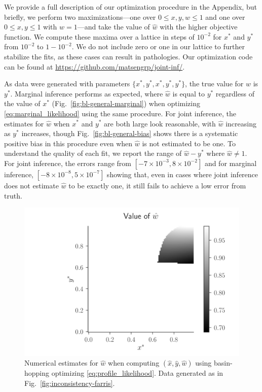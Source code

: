 \documentclass[11pt]{article}
\begin{document}
We provide a full description of our optimization procedure in the Appendix, but briefly, we perform two maximizations---one over $0 \le x,y,w \le 1$ and one over $0 \le x,y \le 1$ with $w=1$---and take the value of $\hat{w}$ with the higher objective function.
We compute these maxima over a lattice in steps of $10^{-2}$ for $x^*$ and $y^*$ from $10^{-2}$ to $1-10^{-2}$.
We do not include zero or one in our lattice to further stabilize the fits, as these cases can result in pathologies.
Our optimization code can be found at \url{https://github.com/matsengrp/joint-inf/}.

As data were generated with parameters $\{x^*, y^*, x^*, y^*, y^*\}$, the true value for $w$ is $y^*$.
Marginal inference performs as expected, where $\hat{w}$ is equal to $y^*$ regardless of the value of $x^*$ (Fig.~\ref{fig:bl-general-marginal}) when optimizing \eqref{eq:marginal_likelihood} using the same procedure.
For joint inference, the estimates for $\hat{w}$ when $x^*$ and $y^*$ are both large look reasonable, with $\hat{w}$ increasing as $y^*$ increases, though Fig.~\ref{fig:bl-general-bias} shows there is a systematic positive bias in this procedure even when $\hat{w}$ is not estimated to be one.
To understand the quality of each fit, we report the range of $\hat{w}-y^*$ where $\hat{w}\neq 1$.
For joint inference, the errors range from $[-7\times 10^{-3}, 8\times 10^{-2}]$ and for marginal inference, $[-8\times 10^{-8}, 5\times 10^{-7}]$ showing that, even in cases where joint inference does not estimate $\hat{w}$ to be exactly one, it still fails to achieve a low error from truth.

\begin{figure}
\centering
\includegraphics[width=\textwidth]{w-hat-empirical-01}
\caption{
    Numerical estimates for $\hat{w}$ when computing $(\hat{x}, \hat{y}, \hat{w})$ using basin-hopping \citep{Wales1997} optimizing \eqref{eq:profile_likelihood}.
    Data generated as in Fig.~\ref{fig:inconsistency-farris}.
}
\label{fig:bl-general-inconsistency}
\end{figure}
\end{document}
